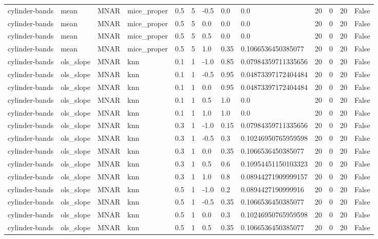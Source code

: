 \begin{tabular}{lllllllllllll}
cylinder-bands & mean & MNAR & mice\_proper & 0.5 & 5 & -0.5 & 0.0 & 0.0 & 20 & 0 & 20 & False \\
cylinder-bands & mean & MNAR & mice\_proper & 0.5 & 5 & 0.0 & 0.0 & 0.0 & 20 & 0 & 20 & False \\
cylinder-bands & mean & MNAR & mice\_proper & 0.5 & 5 & 0.5 & 0.0 & 0.0 & 20 & 0 & 20 & False \\
cylinder-bands & mean & MNAR & mice\_proper & 0.5 & 5 & 1.0 & 0.35 & 0.1066536450385077 & 20 & 0 & 20 & False \\
cylinder-bands & ols\_slope & MNAR & knn & 0.1 & 1 & -1.0 & 0.85 & 0.07984359711335656 & 20 & 0 & 20 & False \\
cylinder-bands & ols\_slope & MNAR & knn & 0.1 & 1 & -0.5 & 0.95 & 0.04873397172404484 & 20 & 0 & 20 & False \\
cylinder-bands & ols\_slope & MNAR & knn & 0.1 & 1 & 0.0 & 0.95 & 0.04873397172404484 & 20 & 0 & 20 & False \\
cylinder-bands & ols\_slope & MNAR & knn & 0.1 & 1 & 0.5 & 1.0 & 0.0 & 20 & 0 & 20 & False \\
cylinder-bands & ols\_slope & MNAR & knn & 0.1 & 1 & 1.0 & 1.0 & 0.0 & 20 & 0 & 20 & False \\
cylinder-bands & ols\_slope & MNAR & knn & 0.3 & 1 & -1.0 & 0.15 & 0.07984359711335656 & 20 & 0 & 20 & False \\
cylinder-bands & ols\_slope & MNAR & knn & 0.3 & 1 & -0.5 & 0.3 & 0.10246950765959598 & 20 & 0 & 20 & False \\
cylinder-bands & ols\_slope & MNAR & knn & 0.3 & 1 & 0.0 & 0.35 & 0.1066536450385077 & 20 & 0 & 20 & False \\
cylinder-bands & ols\_slope & MNAR & knn & 0.3 & 1 & 0.5 & 0.6 & 0.10954451150103323 & 20 & 0 & 20 & False \\
cylinder-bands & ols\_slope & MNAR & knn & 0.3 & 1 & 1.0 & 0.8 & 0.08944271909999157 & 20 & 0 & 20 & False \\
cylinder-bands & ols\_slope & MNAR & knn & 0.5 & 1 & -1.0 & 0.2 & 0.0894427190999916 & 20 & 0 & 20 & False \\
cylinder-bands & ols\_slope & MNAR & knn & 0.5 & 1 & -0.5 & 0.35 & 0.1066536450385077 & 20 & 0 & 20 & False \\
cylinder-bands & ols\_slope & MNAR & knn & 0.5 & 1 & 0.0 & 0.3 & 0.10246950765959598 & 20 & 0 & 20 & False \\
cylinder-bands & ols\_slope & MNAR & knn & 0.5 & 1 & 0.5 & 0.35 & 0.1066536450385077 & 20 & 0 & 20 & False \\

\end{tabular}
